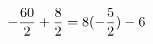 \documentclass[preview]{standalone}
\begin{document}
\begin{align*}
\special{dvisvgm:raw <g id='unique000'>}-\frac{60}{2} + \frac{8}{2} = 8 (- \frac{5}{2}) - 6\special{dvisvgm:raw </g>}
\end{align*}
\end{document}
